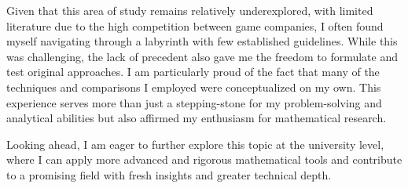 Given that this area of study remains relatively underexplored, with limited literature due to the high competition between game companies, 
I often found myself navigating through a labyrinth with few established guidelines. While this was challenging, the lack of precedent also 
gave me the freedom to formulate and test original approaches. I am particularly proud of the fact that many of the techniques and comparisons 
I employed were conceptualized on my own. This experience serves more than just a stepping-stone for my problem-solving and analytical abilities 
but also affirmed my enthusiasm for mathematical research. 

Looking ahead, I am eager to further explore this topic at the university level, where I can apply more advanced and rigorous mathematical tools 
and contribute to a promising field with fresh insights and greater technical depth.  
